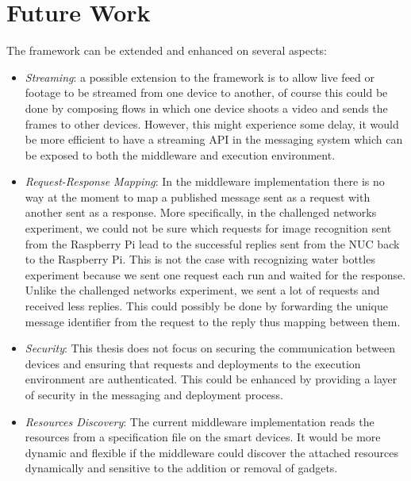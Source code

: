 \section{Future Work}
The framework can be extended and enhanced on several aspects:
\begin{itemize}
\item \textit{Streaming}: a possible extension to the framework is to allow live feed or footage to be streamed from one device to another, of course this could be done by composing flows in which one device shoots a video and sends the frames to other devices. However, this might experience some delay, it would be more efficient to have a streaming API in the messaging system which can be exposed to both the middleware and execution environment.

\item \textit{Request-Response Mapping}: In the middleware implementation there is no way at the moment to map a published message sent as a request  with another sent as a response. More specifically, in the challenged networks experiment, we could not be sure which requests for image recognition sent from the Raspberry Pi lead to the successful  replies  sent from the NUC back to the Raspberry Pi. This is not the case with recognizing water bottles experiment because we sent one request each run and waited for the response. Unlike the challenged networks experiment, we sent a lot of requests and received less replies. This could possibly be done by forwarding the unique message identifier from the request to the reply thus mapping between them.

\item \textit{Security}: This thesis does  not focus on securing the communication between devices and ensuring that requests and deployments to the execution environment are authenticated. This could be enhanced by providing a layer of security in the messaging and deployment process.

\item \textit{Resources Discovery}: The current middleware implementation reads the resources from a specification file on the smart devices. It would be more dynamic and flexible if the middleware could discover the attached resources dynamically and sensitive to the addition or removal of gadgets. 

\end{itemize}